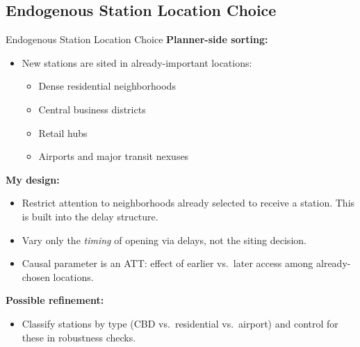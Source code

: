 \documentclass{beamer}
\begin{document}
\subsection{Endogenous Station Location Choice}
\begin{frame}{Endogenous Station Location Choice}
\small
\textbf{Planner-side sorting:}
\begin{itemize}
    \item New stations are sited in already-important locations:
    \begin{itemize}
        \item Dense residential neighborhoods
        \item Central business districts 
        \item Retail hubs
        \item Airports and major transit nexuses \parencite{tyndall_airports}
    \end{itemize}
\end{itemize}

\medskip
\textbf{My design:}
\begin{itemize}
    \item Restrict attention to neighborhoods already selected to receive a station. This is built into the delay structure.
    \item Vary only the \emph{timing} of opening via delays, not the siting decision.
    \item Causal parameter is an ATT: effect of earlier vs.\ later access among already-chosen locations.
\end{itemize}

\medskip
\textbf{Possible refinement:}
\begin{itemize}
    \item Classify stations by type (CBD vs.\ residential vs.\ airport) and control for these in robustness checks.
\end{itemize}
\end{frame}
\end{document}
